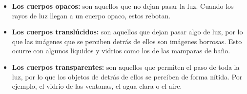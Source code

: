 \begin{itemize}
\item \textbf{Los cuerpos opacos:} son aquellos que no dejan pasar la luz. Cuando los rayos de luz llegan a un cuerpo opaco, estos rebotan.

\item \textbf{Los cuerpos translúcidos:} son aquellos que dejan pasar algo de luz, por lo que las imágenes que se perciben detrás de ellos son imágenes borrosas. Esto ocurre con algunos líquidos y vidrios como los de las mamparas de baño.


\item \textbf{Los cuerpos transparentes:} son aquellos que permiten el paso de toda la luz, por lo que los objetos de detrás de ellos se perciben de forma nítida. Por ejemplo, el vidrio de las ventanas, el agua clara o el aire.
\end{itemize}